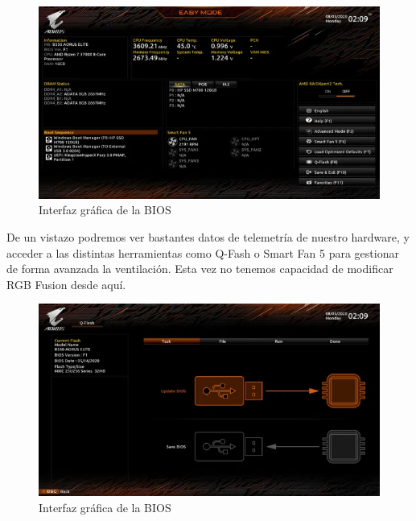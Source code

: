\documentclass{article}
\begin{document}
        \newpage          
          \begin{figure}[h]
            \centering
            \includegraphics[scale = 0.5]{img/BIOS1.png}
            \caption{Interfaz gráfica de la BIOS}
          \end{figure}
          De un vistazo podremos ver bastantes datos de telemetría de nuestro hardware, y acceder a las distintas herramientas como Q-Fash o Smart Fan 5 para gestionar de forma avanzada la ventilación. Esta vez no tenemos capacidad de modificar RGB Fusion 
          desde aquí.\\
          \begin{figure}[h]
            \centering
            \includegraphics[scale = 0.5]{img/BIOS2.png}
            \caption{Interfaz gráfica de la BIOS}
          \end{figure}
        \newpage
\end{document}
